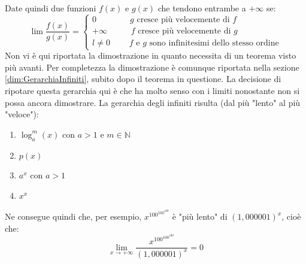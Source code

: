 Date quindi due funzioni $f(x)$ e $g(x)$ che tendono entrambe a $+ \infty$ se:
\begin{equation*}
    \lim \dfrac{f(x)}{g(x)} =
    \begin{cases*}
        0 \qquad \qquad g \text{ cresce più velocemente di } f\\
        +\infty \qquad \;\;\; f \text{ cresce più velocemente di } g\\
        l \neq 0 \qquad \; \text{$f$ e $g$ sono infinitesimi dello stesso ordine}
    \end{cases*}
\end{equation*}
Non vi è qui riportata la dimostrazione in quanto necessita di un teorema visto più avanti. Per completezza la dimostrazione è comunque riportata nella sezione \ref{dim:GerarchiaInfiniti}, subito dopo il teorema in questione. La decisione di ripotare questa gerarchia qui è che ha molto senso con i limiti nonostante non si possa ancora dimostrare. La gerarchia degli infiniti risulta (dal più "lento" al più "veloce"):
\begin{enumerate}
	\item $\log_a^m (x)$ con $a > 1$ e $m \in \mathbb{N}$
	\item $p(x)$
	\item $a^x$ con $a > 1$
	\item $x^x$
\end{enumerate}
Ne consegue quindi che, per esempio, $x^{100^{100^{100}}}$ è "più lento" di $(1,000001)^x$, cioè che:
\begin{equation*}
    \lim_{x \to + \infty} \dfrac{x^{100^{100^{100}}}}{(1,000001)^x} = 0
\end{equation*}

